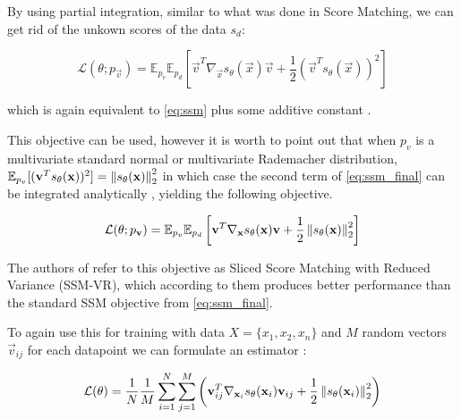 By using partial integration, similar to what was done in Score Matching, we can get rid of the unkown scores of the data $s_d$:

\begin{equation}
    \label{eq:ssm_final}
    \mathcal{L}(\theta; p_\vec{v}) = \mathbb{E}_{p_v} \mathbb{E}_{p_d} \left[ \vec{v}^T \nabla_\vec{x} s_\theta(\vec{x}) \vec{v} + \frac{1}{2} \left( \vec{v}^T s_\theta(\vec{x}) \right)^2 \right]
\end{equation}

which is again equivalent to \ref{eq:ssm} plus some additive constant \cite{ssm}. 

This objective can be used, however
it is worth to point out that when $p_v$ is a multivariate standard normal or multivariate Rademacher distribution, 
$\mathbb{E}_{p_v} [ ( \textbf{v}^T s_\theta(\textbf{x}) )^2 ] = \left\lVert s_\theta(\textbf{x})\right\rVert_2^2$ in which case the second term 
of \ref{eq:ssm_final} can be integrated analytically \cite{ssm}, yielding the following objective.

\begin{equation}
    \mathcal{L}(\theta; p_{\textbf{v}}) = \mathbb{E}_{p_v} \mathbb{E}_{p_d} \left[ \textbf{v}^T \nabla_{\textbf{x}} s_\theta(\textbf{x}) \textbf{v} + \frac{1}{2} \left\lVert s_\theta(\textbf{x}) \right\rVert^2_2 \right]
\end{equation}

The authors of \cite{ssm} refer to this objective as 
Sliced Score Matching with Reduced Variance (SSM-VR), which according to them produces better performance than the standard SSM objective from \ref{eq:ssm_final}.

To again use this for training with data $X = \{x_1, x_2, x_n\}$ and $M$ random vectors $\vec v_{ij}$ for each datapoint we can formulate an estimator \cite{ssm}:

\begin{equation}
    \label{eq:ssm_vr}
    \mathcal{L}(\theta) = \frac{1}{N} \frac{1}{M} \sum_{i=1}^{N} \sum_{j=1}^{M} \left( \textbf{v}_{ij}^T \nabla_{\textbf{x}_i} s_{\theta}(\textbf{x}_i) \textbf{v}_{ij} + \frac{1}{2} \left\lVert s_{\theta}(\textbf{x}_i) \right\rVert^2_2 \right)
\end{equation}